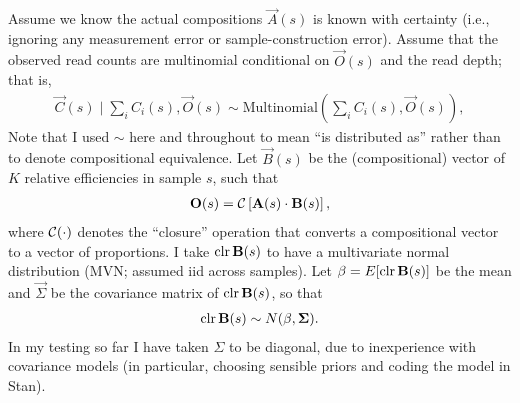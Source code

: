 Assume we know the actual compositions $\vec A(s)$ is known with certainty
(i.e., ignoring any measurement error or sample-construction error).  Assume
that the observed read counts are multinomial conditional on $\vec O(s)$ and
the read depth; that is,
\begin{align}
  \vec C(s) \mid \sum_i C_i(s), \vec O(s) 
  \sim \mathrm{Multinomial}\left(\sum_i C_i(s), \vec O(s) \right),
\end{align}
Note that I used $\sim$ here and throughout to mean ``is distributed as''
rather than to denote compositional equivalence.
Let $\vec B(s)$ be the (compositional) vector of $K$ relative efficiencies in
sample $s$, such that
\begin{align} 
  \label{}
  \mathbf{O}(s) = \operatorname{\mathcal{C}}\left[\mathbf{A}(s) \cdot \mathbf{B}(s)\right],
\end{align}
where $\operatorname{\mathcal{C}}(\cdot)$ denotes the ``closure'' operation that converts a
compositional vector to a vector of proportions.
I take $\operatorname{clr} \mathbf{B}(s)$ to have a multivariate normal distribution (MVN;
assumed iid across samples). Let $\beta = E[\operatorname{clr} \mathbf{B}(s)]$ be the mean and
$\vec \Sigma$ be the covariance matrix of $\operatorname{clr} \mathbf{B}(s)$, so that
\begin{align*}
  \operatorname{clr} \mathbf{B}(s) \sim N(\mathbf{\beta}, \mathbf{\Sigma}).
\end{align*}
In my testing so far I have taken $\Sigma$ to be diagonal, due to inexperience
with covariance models (in particular, choosing sensible priors and coding the
model in Stan).




